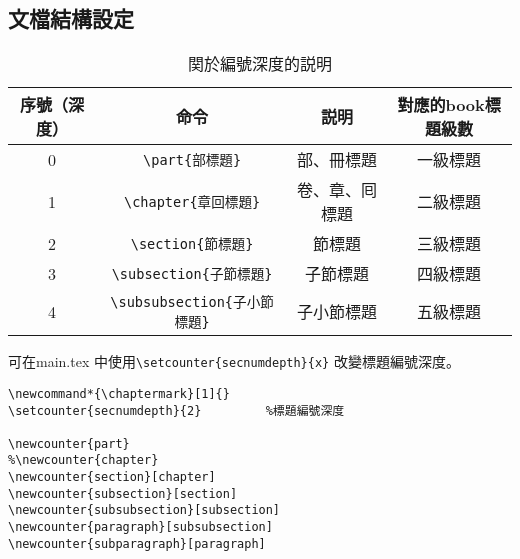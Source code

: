 %
\subsection{文檔結構設定}

\begin{table}[H]
\begin{center}
\caption{関於編號深度的説明}
\begin{tabular}{cccc}
\hline
序號（深度） & 命令& 説明 & 對應的book標題級數 \\ \hline
0 & \verb+\part{部標題}+ & 部、冊標題 & 一級標題 \\
1 & \verb+\chapter{章回標題}+ & 卷、章、囘標題 & 二級標題  \\
2 & \verb+\section{節標題}+ & 節標題 & 三級標題 \\
3 & \verb+\subsection{子節標題}+ & 子節標題 & 四級標題 \\
4 & \verb+\subsubsection{子小節標題}+ & 子小節標題 & 五級標題 \\ \hline
\end{tabular}
\end{center}
\end{table}

\par 可在main.tex 中使用\verb+\setcounter{secnumdepth}{x}+
改變標題編號深度。
%
\begin{lstlisting}[firstnumber=574]
\newcommand*{\chaptermark}[1]{}
\setcounter{secnumdepth}{2}			%標題編號深度

\newcounter{part}
%\newcounter{chapter}
\newcounter{section}[chapter]
\newcounter{subsection}[section]
\newcounter{subsubsection}[subsection]
\newcounter{paragraph}[subsubsection]
\newcounter{subparagraph}[paragraph]
\end{lstlisting}



